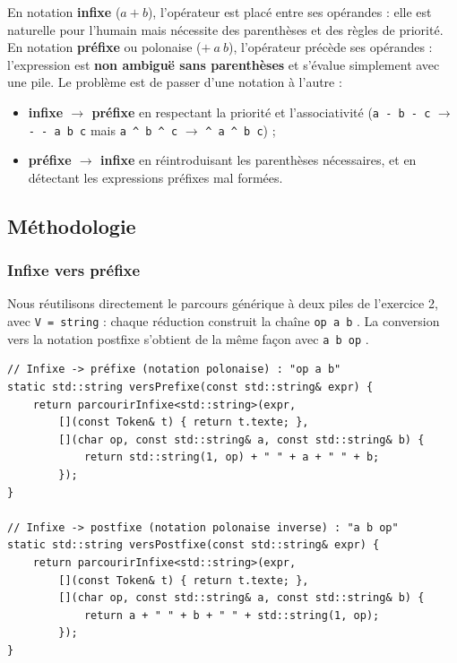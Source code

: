\documentclass[11pt,a4paper]{article}
\newcommand{\code}[1]{\texttt{#1}}
\begin{document}
En notation \textbf{infixe} ($a + b$), l'opérateur est placé entre ses
opérandes : elle est naturelle pour l'humain mais nécessite des parenthèses
et des règles de priorité. En notation \textbf{préfixe} ou polonaise
($+\ a\ b$), l'opérateur précède ses opérandes : l'expression est
\textbf{non ambiguë sans parenthèses} et s'évalue simplement avec une pile.
Le problème est de passer d'une notation à l'autre :
\begin{itemize}
  \item \textbf{infixe $\to$ préfixe} en respectant la priorité et
        l'associativité (\code{a - b - c} $\to$ \code{- - a b c} mais
        \code{a \textasciicircum{} b \textasciicircum{} c} $\to$
        \code{\textasciicircum{} a \textasciicircum{} b c}) ;
  \item \textbf{préfixe $\to$ infixe} en réintroduisant les parenthèses
        nécessaires, et en détectant les expressions préfixes mal formées.
\end{itemize}

\subsection{Méthodologie}

\subsubsection{Infixe vers préfixe}

Nous réutilisons directement le parcours générique à deux piles de
l'exercice 2, avec \code{V = string} : chaque réduction construit la chaîne
\og \code{op a b} \fg{}. La conversion vers la notation postfixe s'obtient de
la même façon avec \og \code{a b op} \fg{}.

\begin{lstlisting}[caption={Conversions obtenues par spécialisation du parcours générique}]
// Infixe -> préfixe (notation polonaise) : "op a b"
static std::string versPrefixe(const std::string& expr) {
    return parcourirInfixe<std::string>(expr,
        [](const Token& t) { return t.texte; },
        [](char op, const std::string& a, const std::string& b) {
            return std::string(1, op) + " " + a + " " + b;
        });
}

// Infixe -> postfixe (notation polonaise inverse) : "a b op"
static std::string versPostfixe(const std::string& expr) {
    return parcourirInfixe<std::string>(expr,
        [](const Token& t) { return t.texte; },
        [](char op, const std::string& a, const std::string& b) {
            return a + " " + b + " " + std::string(1, op);
        });
}
\end{lstlisting}
\end{document}
